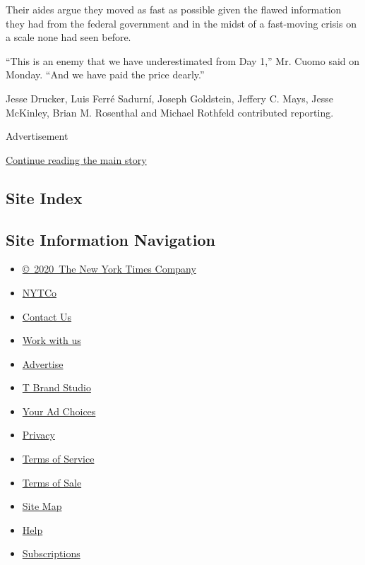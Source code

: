 Their aides argue they moved as fast as possible given the flawed
information they had from the federal government and in the midst of a
fast-moving crisis on a scale none had seen before.

``This is an enemy that we have underestimated from Day 1,'' Mr. Cuomo
said on Monday. ``And we have paid the price dearly.''

Jesse Drucker, Luis Ferré Sadurní, Joseph Goldstein, Jeffery C. Mays,
Jesse McKinley, Brian M. Rosenthal and Michael Rothfeld contributed
reporting.

Advertisement

\protect\hyperlink{after-bottom}{Continue reading the main story}

\hypertarget{site-index}{%
\subsection{Site Index}\label{site-index}}

\hypertarget{site-information-navigation}{%
\subsection{Site Information
Navigation}\label{site-information-navigation}}

\begin{itemize}
\tightlist
\item
  \href{https://help.nytimes.com/hc/en-us/articles/115014792127-Copyright-notice}{©~2020~The
  New York Times Company}
\end{itemize}

\begin{itemize}
\tightlist
\item
  \href{https://www.nytco.com/}{NYTCo}
\item
  \href{https://help.nytimes.com/hc/en-us/articles/115015385887-Contact-Us}{Contact
  Us}
\item
  \href{https://www.nytco.com/careers/}{Work with us}
\item
  \href{https://nytmediakit.com/}{Advertise}
\item
  \href{http://www.tbrandstudio.com/}{T Brand Studio}
\item
  \href{https://www.nytimes.com/privacy/cookie-policy\#how-do-i-manage-trackers}{Your
  Ad Choices}
\item
  \href{https://www.nytimes.com/privacy}{Privacy}
\item
  \href{https://help.nytimes.com/hc/en-us/articles/115014893428-Terms-of-service}{Terms
  of Service}
\item
  \href{https://help.nytimes.com/hc/en-us/articles/115014893968-Terms-of-sale}{Terms
  of Sale}
\item
  \href{https://spiderbites.nytimes.com}{Site Map}
\item
  \href{https://help.nytimes.com/hc/en-us}{Help}
\item
  \href{https://www.nytimes.com/subscription?campaignId=37WXW}{Subscriptions}
\end{itemize}
